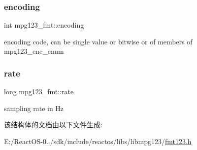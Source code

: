 \subsubsection{\texorpdfstring{encoding}{encoding}}
{\footnotesize\ttfamily int mpg123\+\_\+fmt\+::encoding}

encoding code, can be single value or bitwise or of members of mpg123\+\_\+enc\+\_\+enum \mbox{\label{structmpg123__fmt_ac28086d4f9023626dbbf2ba6601a108e}} 
\subsubsection{\texorpdfstring{rate}{rate}}
{\footnotesize\ttfamily long mpg123\+\_\+fmt\+::rate}

sampling rate in Hz 

该结构体的文档由以下文件生成\+:\begin{DoxyCompactItemize}
\item 
E\+:/\+React\+O\+S-\/0../sdk/include/reactos/libs/libmpg123/\hyperlink{fmt123_8h}{fmt123.\+h}\end{DoxyCompactItemize}
